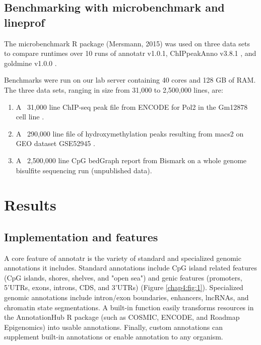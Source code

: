 \subsection{Benchmarking with microbenchmark and lineprof}
\label{annotatr_methods_benchmarking}

The microbenchmark R package (Mersmann, 2015) was used on three data sets to compare runtimes over 10 runs of annotatr v1.0.1, ChIPpeakAnno v3.8.1 \cite{Zhu:2010be}, and goldmine v1.0.0 \cite{Bhasin:2016bk}.

Benchmarks were run on our lab server containing 40 cores and 128 GB of RAM. The three data sets, ranging in size from 31,000 to 2,500,000 lines, are:

\begin{enumerate}
	\item A ~31,000 line ChIP-seq peak file from ENCODE for Pol2 in the Gm12878 cell line \cite{ENCODEProjectConsortium:2012gc}.
	\item A ~290,000 line file of hydroxymethylation peaks resulting from macs2 \cite{Zhang:2008gm} on GEO dataset GSE52945 \cite{Figueroa:2010ch}.
	\item A ~2,500,000 line CpG bedGraph report from Bismark \cite{Krueger:2011eb} on a whole genome bisulfite sequencing run (unpublished data).
\end{enumerate}

\section{Results}
\label{annotatr_results}

\subsection{Implementation and features}
\label{annotatr_results_implementation}

A core feature of annotatr is the variety of standard and specialized genomic annotations it includes. Standard annotations include CpG island related features (CpG islands, shores, shelves, and "open sea") and genic features (promoters, 5'UTRs, exons, introns, CDS, and 3'UTRs) (Figure \ref{chap4:fig:1}). Specialized genomic annotations include intron/exon boundaries, enhancers, lncRNAs, and chromatin state segmentations. A built-in function easily transforms resources in the AnnotationHub R package (such as COSMIC, ENCODE, and Roadmap Epigenomics) into usable annotations. Finally, custom annotations can supplement built-in annotations or enable annotation to any organism.

